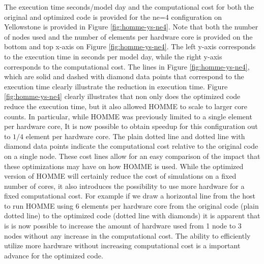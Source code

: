 
The execution time seconds/model day and the computational cost for both the original and optimized code is provided for the ne=4 configuration on Yellowstone is provided in Figure \ref{fig:homme-ys-ne4}.  Note that both the number of nodes used and the number of elements per hardware core is provided on the bottom and top x-axis on Figure \ref{fig:homme-ys-ne4}.  The left y-axis corresponds to the execution time in seconds per model day, while the right y-axis corresponds to the computational cost.  The lines in Figure \ref{fig:homme-ys-ne4}, which are solid and dashed with diamond data points that correspond to the execution time clearly illustrate the reduction in execution time.  Figure \ref{fig:homme-ys-ne4} clearly illustrates that non only does the optimized code reduce the execution time, but it also allowed HOMME to scale to larger core counts.  In particular, while HOMME was previously limited to a single element per hardware core, It is now possible to obtain speedup for this configuration out to $1/4$ element per hardware core.  The plain dotted line and dotted line with diamond data points indicate the computational cost relative to the original code on a single node.  These cost lines allow for an easy comparison of the impact that these optimizations may have on how HOMME is used.  While the optimized version of HOMME will certainly reduce the cost of simulations on a fixed number of cores, it also introduces the possibility to use more hardware for a fixed computational cost.  For example if we draw a horizontal line from the host to run HOMME using 6 elements per hardware core from the original code (plain dotted line) to the optimized code (dotted line with diamonds) it is apparent that is is now possible to increase the amount of hardware used from 1 node to 3 nodes without any increase in the computational cost.  The ability to efficiently utilize more hardware without increasing computational cost is a important advance for the optimized code.  

